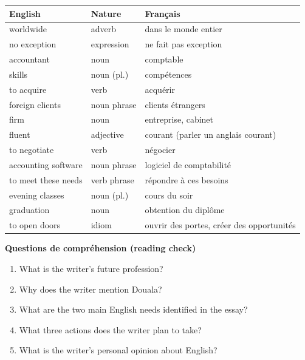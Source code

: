\documentclass[11pt]{article}
\begin{document}
\begin{center}
\begin{tabularx}{\linewidth}{|l|l|X|}
\hline
\rowcolor{popblueL} \textbf{English} & \textbf{Nature} & \textbf{Français} \\
\hline
worldwide & adverb & dans le monde entier \\
\hline
no exception & expression & ne fait pas exception \\
\hline
accountant & noun & comptable \\
\hline
skills & noun (pl.) & compétences \\
\hline
to acquire & verb & acquérir \\
\hline
foreign clients & noun phrase & clients étrangers \\
\hline
firm & noun & entreprise, cabinet \\
\hline
fluent & adjective & courant (parler un anglais courant) \\
\hline
to negotiate & verb & négocier \\
\hline
accounting software & noun phrase & logiciel de comptabilité \\
\hline
to meet these needs & verb phrase & répondre à ces besoins \\
\hline
evening classes & noun (pl.) & cours du soir \\
\hline
graduation & noun & obtention du diplôme \\
\hline
to open doors & idiom & ouvrir des portes, créer des opportunités \\
\hline
\end{tabularx}
\end{center}

\textbf{Questions de compréhension (reading check)}

\begin{enumerate}
\item What is the writer's future profession?
\item Why does the writer mention Douala?
\item What are the two main English needs identified in the essay?
\item What three actions does the writer plan to take?
\item What is the writer's personal opinion about English?
\end{enumerate}
\end{document}
